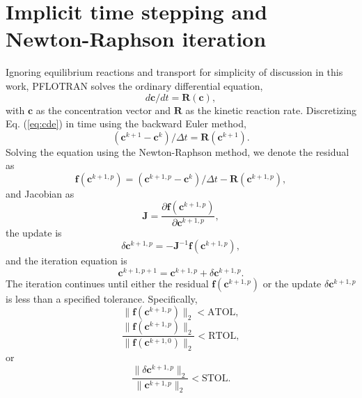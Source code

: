 \documentclass[gmd, manuscript]{copernicus}
\begin{document}
\section{Implicit time stepping and Newton-Raphson iteration}
\label{sec:newton}
Ignoring equilibrium reactions and transport for simplicity of discussion in
this work, PFLOTRAN solves the ordinary differential equation,
\begin{equation}
\label{eq:cde}
{d \mathbf{c}}/{d t} = \mathbf{R}(\mathbf{c}),
\end{equation}
with $\mathbf{c}$ as the concentration vector and $\mathbf{R}$ as the kinetic reaction rate. 
Discretizing Eq. (\ref{eq:cde}) in time using the backward Euler method, 
\begin{equation}
{(\mathbf{c}^{k+1} - \mathbf{c}^k)}/{\Delta t} = \mathbf{R}(\mathbf{c}^{k+1}).
\label{eq:cdedis}
\end{equation}
Solving the equation  using the Newton-Raphson method, we denote the residual as
\begin{equation}
\mathbf{f}(\mathbf{c}^{k+1,p} )=(\mathbf{c}^{k+1,p}-\mathbf{c}^k)/\Delta t-\mathbf{R}(\mathbf{c}^{k+1,p}),
\label{eq:residual}
\end{equation}
and Jacobian as
\begin{equation}
\mathbf{J} = \frac{\partial \mathbf{f}(\mathbf{c}^{k+1,p})}{\partial \mathbf{c}^{k+1,p}},
\label{eq:jacobian}
\end{equation}
the update is
\begin{equation}
\delta \mathbf{c}^{k+1,p}= -\mathbf{J}^{-1} \mathbf{f} (\mathbf{c}^{k+1,p}),
\label{eq:axb}
\end{equation}
and the iteration equation is
\begin{equation}
\mathbf{c}^{k+1,p+1}=\mathbf{c}^{k+1,p}+\delta \mathbf{c}^{k+1,p}.
\label{eq:update}
\end{equation}
The iteration continues until either the residual
$\mathbf{f}(\mathbf{c}^{k+1,p} )$ or the update $\delta
\mathbf{c}^{k+1,p}$ is less than a specified tolerance. Specifically,
\begin{equation}
\|\mathbf{f}(\mathbf{c}^{k+1,p} )\|_2 < \text{ATOL},
\label{eq:atol}
\end{equation}
\begin{equation}
\frac{\|\mathbf{f}(\mathbf{c}^{k+1,p} )\|_2}{\|\mathbf{f}(\mathbf{c}^{k+1,0} )\|_2} < \text{RTOL},
\label{eq:rtol}
\end{equation}
or
\begin{equation}
\frac{\|\delta \mathbf{c}^{k+1,p} \|_2}{\|\mathbf{c}^{k+1,p} \|_2} < \text{STOL}.
\label{eq:stol}
\end{equation}
\end{document}
